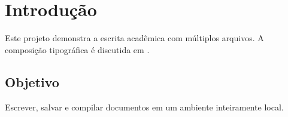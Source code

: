 \chapter{Introdução}
Este projeto demonstra a escrita acadêmica com múltiplos arquivos.
A composição tipográfica é discutida em .
\section{Objetivo}
Escrever, salvar e compilar documentos em um ambiente inteiramente local.
